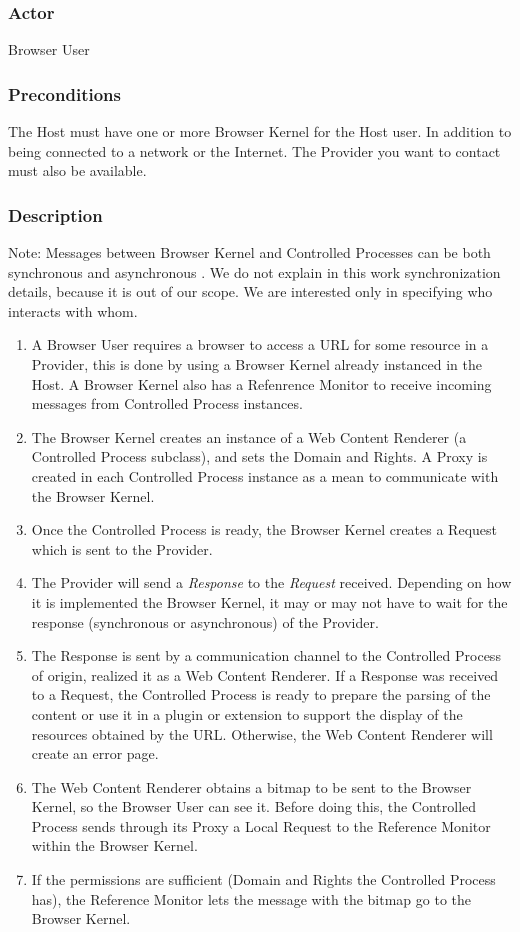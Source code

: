 \documentclass{sig-alternate-05-2015}
\begin{document}
    \subsubsection*{Actor} Browser User
    \subsubsection*{Preconditions} The Host must have one or more Browser Kernel for the Host user. In addition to being connected to a network or the Internet. The Provider you want to contact must also be available.
    \subsubsection*{Description}
    Note: Messages between Browser Kernel and Controlled Processes can be both synchronous and asynchronous \cite{firefoxIPC,GCIPC}. We do not explain in this work synchronization details, because it is out of our scope. We are interested only in specifying who interacts with whom.
      \begin{enumerate}
        \item A Browser User requires a browser to access a URL for some resource in a Provider, this is done by using a Browser Kernel already instanced in the Host. A Browser Kernel also has a Refenrence Monitor to receive incoming messages from Controlled Process instances.
        \item The Browser Kernel creates an instance of a Web Content Renderer (a Controlled Process subclass), and sets the Domain and Rights. A Proxy is created in each Controlled Process instance as a mean to communicate with the Browser Kernel.
        \item Once the Controlled Process is ready, the Browser Kernel creates a Request which is sent to the Provider.
        \item The Provider will send a \textit{Response} to the \textit{Request} received. Depending on how it is implemented the Browser Kernel, it may or may not have to wait for the response (synchronous or asynchronous) of the Provider.
        \item The Response is sent by a communication channel to the Controlled Process of origin, realized it as a Web Content Renderer. If a Response was received to a Request, the Controlled Process is ready to prepare the parsing of the content or use it in a plugin or extension to support the display of the resources obtained by the URL. Otherwise, the Web Content Renderer will create an error page.
        \item The Web Content Renderer obtains a bitmap to be sent to the Browser Kernel, so the Browser User can see it. Before doing this, the Controlled Process sends through its Proxy a Local Request to the Reference Monitor within the Browser Kernel.
        \item If the permissions are sufficient (Domain and Rights the Controlled Process has), the Reference Monitor lets the message with the bitmap go to the Browser Kernel.
      \end{enumerate}
\end{document}
